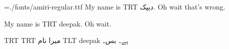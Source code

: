 
\nopagenumbers
\parindent=0mm
\font\amiri={./fonts/amiri-regular.ttf}
\amiri
My name is {\textdir TRT دیپک}. Oh wait that’s wrong.

My name is {\textdir TRT deepak}. Oh wait.

\pardir TRT
\textdir TRT
میرا نام {\textdir TLT deepak} ہے۔ بس۔
\bye
